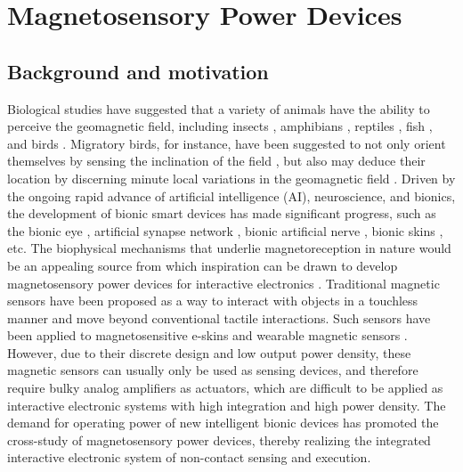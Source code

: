 \chapter{Magnetosensory Power Devices}
\label{ch:Magnetosensory Power Devices}

\ifpdf
    \graphicspath{{Chapter4/Figs/Raster/}{Chapter4/Figs/PDF/}{Chapter4/Figs/}}
\else
    \graphicspath{{Chapter4/Figs/Vector/}{Chapter4/Figs/}}
\fi

\section{Background and motivation}
\label{sec:Background and motivation}
Biological  studies have suggested that a variety of animals have the ability to perceive the geomagnetic field, including insects \cite{dreyer2018earth}, amphibians \cite{fischer2001evidence}, reptiles \cite{diego2017spontaneous}, fish \cite{naisbett2020magnetoreception}, and birds \cite{ossenkopp1978bird}. Migratory birds, for instance, have been suggested to not only orient themselves by sensing the inclination of the field \cite{ritz2000model}, but also may deduce their location by discerning minute local variations in the geomagnetic field \cite{kishkinev2015eurasian,mouritsen2005magnetoreception}. Driven by the ongoing rapid advance of artificial intelligence (AI), neuroscience, and bionics, the development of bionic  smart devices has made significant progress, such as the bionic eye \cite{ong2012bionic}, artificial synapse network \cite{zhu2014artificial}, bionic artificial nerve \cite{liao2020bioinspired}, bionic skins \cite{cao2019self}, etc. The biophysical mechanisms that underlie magnetoreception in nature would be an appealing source from which inspiration can be drawn to develop magnetosensory power devices for  interactive electronics \cite{canon2018electronic,makushko2021flexible}. Traditional magnetic sensors have been proposed as a way to interact with objects in a touchless manner and move beyond conventional tactile interactions. Such sensors have been applied to magnetosensitive e-skins \cite{canon2018magnetosensitive} and wearable magnetic sensors \cite{melzer2015wearable}. However, due to their discrete design and low output power density, these magnetic sensors can usually only be used as sensing devices, and therefore require bulky analog amplifiers as actuators, which are difficult to be applied as interactive electronic  systems with high integration and high power density. The demand for operating power of new intelligent bionic devices has promoted the cross-study of magnetosensory power devices, thereby realizing the integrated interactive electronic system of non-contact sensing and execution. 

